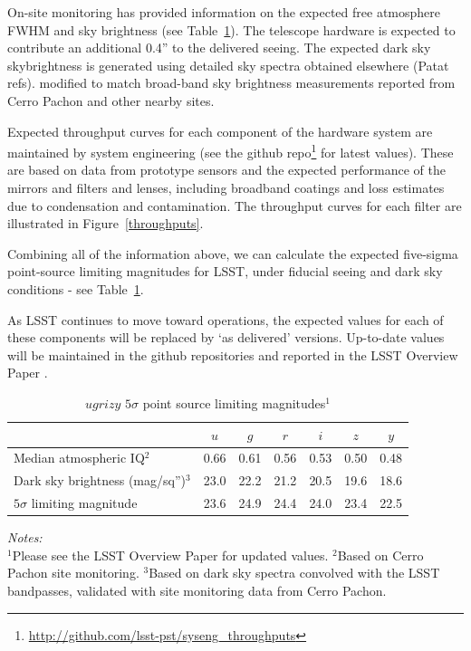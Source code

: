 \documentclass{iau}
\begin{document}
On-site monitoring has provided information on the expected free
atmosphere FWHM and sky brightness (see Table~\ref{table2}). The
telescope hardware is expected to contribute an additional 0.4'' to
the delivered seeing. The expected dark sky skybrightness is generated using
detailed sky spectra obtained elsewhere (Patat refs). modified to
match broad-band sky brightness measurements reported from Cerro
Pachon and other nearby sites.

Expected throughput curves for each component of the hardware system
are maintained by system engineering (see the github
repo\footnote{\url{http://github.com/lsst-pst/syseng_throughputs}} for
latest values).  These are based on data from prototype sensors and
the expected performance of the mirrors and filters and lenses,
including broadband coatings and loss estimates due to condensation
and contamination. The throughput curves for each filter are
illustrated in Figure~\ref{throughputs}.

Combining all of the information above, we can calculate the
expected five-sigma point-source limiting magnitudes for LSST, under
fiducial seeing and dark sky conditions - see Table~\ref{table2}.

As LSST continues to move toward operations, the expected values for each
of these components will be replaced by `as delivered'
versions. Up-to-date values will be maintained in the github
repositories and reported in the LSST Overview Paper \cite{overviewpaper}.

\begin{table}[tbh]
\begin{center}
\caption{$ugrizy$ $5\sigma$ point source limiting magnitudes$^1$}
\label{table2}
 {\scriptsize
  \begin{tabular}{|l|c|c|c|c|c|c|}\hline
 & $u$ & $g$ & $r$ & $i$ & $z$ & $y$ \\ \hline
Median atmospheric IQ$^2$  & 0.66 & 0.61 & 0.56 & 0.53 & 0.50 & 0.48 \\
    \hline
Dark sky brightness (mag/sq'')$^3$ & 23.0 & 22.2 &  21.2 & 20.5 & 19.6 & 18.6
    \\ \hline
$5\sigma$ limiting magnitude & 23.6 & 24.9 & 24.4 & 24.0 & 23.4 & 22.5
    \\ \hline
 \end{tabular}
  }
 \end{center}
\vspace{1mm}
 \scriptsize{
 {\it Notes:}\\
  $^1$Please see the LSST Overview Paper \cite{overviewpaper} for
  updated values.
  $^2$Based on Cerro Pachon site monitoring.
  $^3$Based on dark sky spectra convolved with the LSST bandpasses,
  validated with site monitoring data from Cerro Pachon.}
\end{table}
\end{document}
